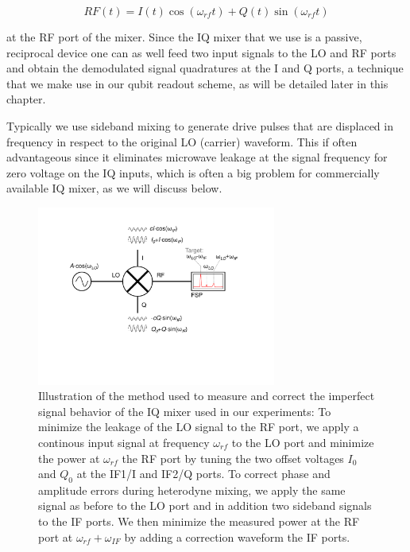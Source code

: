 \begin{equation}
RF(t) = I(t)\cos{(\omega_{rf} t)}+Q(t)\sin{(\omega_{rf} t)} \label{eq:iqMixer}
\end{equation}

at the RF port of the mixer. Since the IQ mixer that we use is a passive, reciprocal device one can as well feed two input signals to the LO and RF ports and obtain the demodulated signal quadratures at the I and Q ports, a technique that we make use in our qubit readout scheme, as will be detailed later in this chapter.

Typically we use sideband mixing to generate drive pulses that are displaced in frequency in respect to the original LO (carrier) waveform. This if often advantageous since it eliminates microwave leakage at the signal frequency for zero voltage on the IQ inputs, which is often a big problem for commercially available IQ mixer, as we will discuss below.

\begin{figure}[ht!]
	\centering
		\includegraphics[width=0.7\textwidth]{"./material/figures/measurement/mixer_imperfections"}
	\caption[...]{Illustration of the method used to measure and correct the imperfect signal behavior of the IQ mixer used in our experiments: To minimize the leakage of the LO signal to the RF port, we apply a continous input signal at frequency $\omega_{rf}$ to the LO port and minimize the power at $\omega_{rf}$ the RF port by tuning the two offset voltages $I_0$ and $Q_0$ at the IF1/I and IF2/Q ports. To correct phase and amplitude errors during heterodyne mixing, we apply the same signal as before to the LO port and in addition two sideband signals to the IF ports. We then minimize the measured power at the RF port at $\omega_{rf}+\omega_{IF}$ by adding a correction waveform the IF ports.}
	\label{fig:iq_mixer_correction}
\end{figure}

